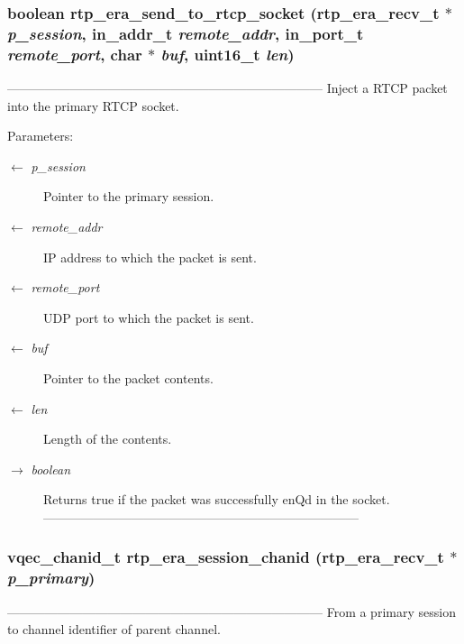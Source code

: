 \subsubsection{\setlength{\rightskip}{0pt plus 5cm}boolean rtp\_\-era\_\-send\_\-to\_\-rtcp\_\-socket (\bf{rtp\_\-era\_\-recv\_\-t} $\ast$ {\em p\_\-session}, in\_\-addr\_\-t {\em remote\_\-addr}, in\_\-port\_\-t {\em remote\_\-port}, char $\ast$ {\em buf}, uint16\_\-t {\em len})}\label{rtp__era__recv_8c_d258d31a1cf483004011f7bd93de0cfd}


--------------------------------------------------------------------------- Inject a RTCP packet into the primary RTCP socket.

\begin{Desc}
\item[Parameters:]
\begin{description}
\item[\mbox{$\leftarrow$} {\em p\_\-session}]Pointer to the primary session. \item[\mbox{$\leftarrow$} {\em remote\_\-addr}]IP address to which the packet is sent. \item[\mbox{$\leftarrow$} {\em remote\_\-port}]UDP port to which the packet is sent. \item[\mbox{$\leftarrow$} {\em buf}]Pointer to the packet contents. \item[\mbox{$\leftarrow$} {\em len}]Length of the contents. \item[\mbox{$\rightarrow$} {\em boolean}]Returns true if the packet was successfully en\-Qd in the socket. --------------------------------------------------------------------------- \end{description}
\end{Desc}
\subsubsection{\setlength{\rightskip}{0pt plus 5cm}\bf{vqec\_\-chanid\_\-t} rtp\_\-era\_\-session\_\-chanid (\bf{rtp\_\-era\_\-recv\_\-t} $\ast$ {\em p\_\-primary})}\label{rtp__era__recv_8c_6b471ba50a286d9745e0e4445c0efe07}


--------------------------------------------------------------------------- From a primary session to channel identifier of parent channel.

